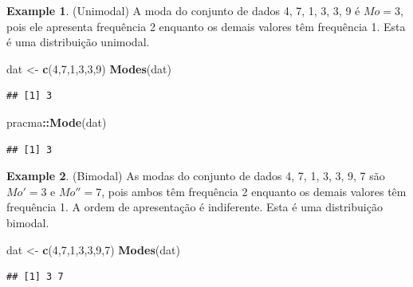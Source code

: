 \documentclass[
]{book}
\newenvironment{Shaded}{\begin{snugshade}}{\end{snugshade}}
\newcommand{\DecValTok}[1]{\textcolor[rgb]{0.00,0.00,0.81}{#1}}
\newcommand{\KeywordTok}[1]{\textcolor[rgb]{0.13,0.29,0.53}{\textbf{#1}}}
\newcommand{\NormalTok}[1]{#1}
\newcommand{\OperatorTok}[1]{\textcolor[rgb]{0.81,0.36,0.00}{\textbf{#1}}}
\newcommand{\StringTok}[1]{\textcolor[rgb]{0.31,0.60,0.02}{#1}}
\theoremstyle{definition}
\theoremstyle{definition}
\newtheorem{example}{Example}[chapter]
\theoremstyle{definition}
\theoremstyle{remark}
\begin{document}
\begin{example}
\protect\hypertarget{exm:moda1}{}{\label{exm:moda1} }(Unimodal) A moda do conjunto de dados 4, 7, 1, 3, 3, 9 é \(Mo=3\), pois ele apresenta frequência 2 enquanto os demais valores têm frequência 1. Esta é uma distribuição unimodal.
\end{example}

\begin{Shaded}
\begin{Highlighting}[]
\NormalTok{dat \textless{}{-}}\StringTok{ }\KeywordTok{c}\NormalTok{(}\DecValTok{4}\NormalTok{,}\DecValTok{7}\NormalTok{,}\DecValTok{1}\NormalTok{,}\DecValTok{3}\NormalTok{,}\DecValTok{3}\NormalTok{,}\DecValTok{9}\NormalTok{)}
\KeywordTok{Modes}\NormalTok{(dat)}
\end{Highlighting}
\end{Shaded}

\begin{verbatim}
## [1] 3
\end{verbatim}

\begin{Shaded}
\begin{Highlighting}[]
\NormalTok{pracma}\OperatorTok{::}\KeywordTok{Mode}\NormalTok{(dat)}
\end{Highlighting}
\end{Shaded}

\begin{verbatim}
## [1] 3
\end{verbatim}

\begin{example}
\protect\hypertarget{exm:moda2}{}{\label{exm:moda2} }(Bimodal) As modas do conjunto de dados 4, 7, 1, 3, 3, 9, 7 são \(Mo'=3\) e \(Mo''=7\), pois ambos têm frequência 2 enquanto os demais valores têm frequência 1. A ordem de apresentação é indiferente. Esta é uma distribuição bimodal.
\end{example}

\begin{Shaded}
\begin{Highlighting}[]
\NormalTok{dat \textless{}{-}}\StringTok{ }\KeywordTok{c}\NormalTok{(}\DecValTok{4}\NormalTok{,}\DecValTok{7}\NormalTok{,}\DecValTok{1}\NormalTok{,}\DecValTok{3}\NormalTok{,}\DecValTok{3}\NormalTok{,}\DecValTok{9}\NormalTok{,}\DecValTok{7}\NormalTok{)}
\KeywordTok{Modes}\NormalTok{(dat)}
\end{Highlighting}
\end{Shaded}

\begin{verbatim}
## [1] 3 7
\end{verbatim}
\end{document}

